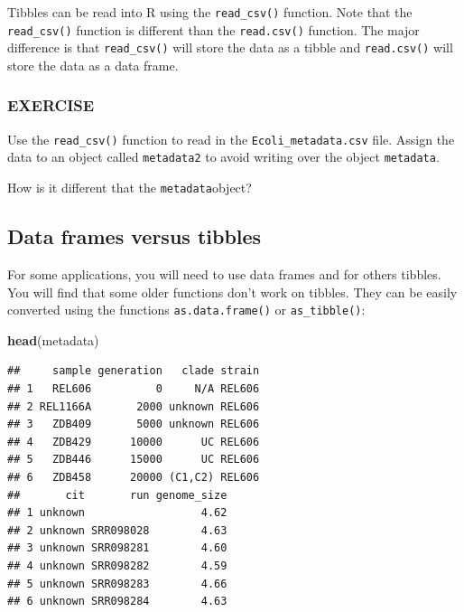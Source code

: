 \documentclass[]{book}
\newenvironment{Shaded}{\begin{snugshade}}{\end{snugshade}}
\newcommand{\KeywordTok}[1]{\textcolor[rgb]{0.13,0.29,0.53}{\textbf{#1}}}
\newcommand{\NormalTok}[1]{#1}
\begin{document}
Tibbles can be read into R using the \texttt{read\_csv()} function. Note that the \texttt{read\_csv()} function is different than the \texttt{read.csv()} function. The major difference is that \texttt{read\_csv()} will store the data as a tibble and \texttt{read.csv()} will store the data as a data frame.

\hypertarget{exercise-14}{%
\subsubsection*{EXERCISE}\label{exercise-14}}

Use the \texttt{read\_csv()} function to read in the \texttt{Ecoli\_metadata.csv} file. Assign the data to an object called \texttt{metadata2} to avoid writing over the object \texttt{metadata}.

How is it different that the \texttt{metadata}object?

\hypertarget{data-frames-versus-tibbles}{%
\subsection*{Data frames versus tibbles}\label{data-frames-versus-tibbles}}

For some applications, you will need to use data frames and for others tibbles. You will find that some older functions don't work on tibbles. They can be easily converted using the functions \texttt{as.data.frame()} or \texttt{as\_tibble()}:

\begin{Shaded}
\begin{Highlighting}[]
\KeywordTok{head}\NormalTok{(metadata)}
\end{Highlighting}
\end{Shaded}

\begin{verbatim}
##     sample generation   clade strain
## 1   REL606          0     N/A REL606
## 2 REL1166A       2000 unknown REL606
## 3   ZDB409       5000 unknown REL606
## 4   ZDB429      10000      UC REL606
## 5   ZDB446      15000      UC REL606
## 6   ZDB458      20000 (C1,C2) REL606
##       cit       run genome_size
## 1 unknown                  4.62
## 2 unknown SRR098028        4.63
## 3 unknown SRR098281        4.60
## 4 unknown SRR098282        4.59
## 5 unknown SRR098283        4.66
## 6 unknown SRR098284        4.63
\end{verbatim}
\end{document}
